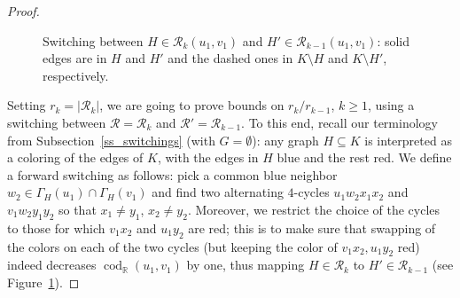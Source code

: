 \documentclass[12pt,reqno]{amsart}
\newcommand{\rc}{{\mathcal{R}}}
\newcommand{\R} {\mathbb R}
\newcommand{\cod}{\operatorname{cod}}
\theoremstyle{definition}
\newcommand{\x}{\rs{\sx}}
\newcommand{\y}{\rs{\sy}}
\newcommand{\sx}{X}
\newcommand{\sy}{Y}
\newcommand{\rs}[1]{s(#1)}
\begin{document}
\begin{proof}
\begin{figure}
\begin{center}
  \end{center}
  \caption{Switching between $H \in \rc_k(u_1,v_1)$ and $H' \in \rc_{k-1}(u_1,v_1)$: solid edges are in $H$ and $H'$ and the dashed ones in $K \setminus H$ and $K \setminus H'$, respectively.}
  \label{fig_codegree}
\end{figure}
Setting $r_k = |\rc_k|$, we are going to prove bounds on $r_k/r_{k-1}$, $k\ge 1$, using a switching between $\rc = \rc_k$ and $\rc' = \rc_{k-1}$. To this end, recall our terminology from Subsection~\ref{ss_switchings} (with $G = \emptyset$): any graph $H \subseteq K$ is interpreted as a coloring of the edges of $K$, with the edges in $H$ blue and the rest red. We define a forward switching
as follows: pick a common blue neighbor $w_2 \in \Gamma_H(u_1) \cap \Gamma_H(v_1)$ and find two alternating $4$-cycles $u_1w_2x_1x_2$ and $v_1w_2y_1y_2$ so that $x_1 \neq y_1$, $x_2 \neq y_2$.
 Moreover, we restrict the choice of the cycles to those for which  $v_1x_2$ and $u_1y_2$ are red; this is to make sure that swapping of the colors on each of the two cycles (but keeping the color of $v_1x_2,u_1y_2$ red) indeed decreases $\cod_{\R}(u_1,v_1)$ by one, thus mapping $H \in \rc_k$ to $H' \in \rc_{k-1}$ (see Figure~\ref{fig_codegree}).


\end{proof}
\end{document}
